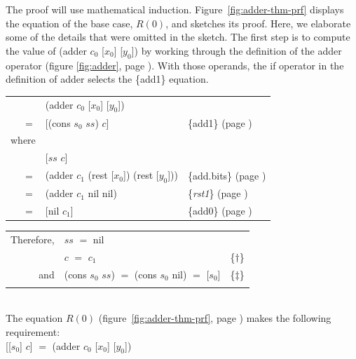 The proof will use mathematical induction.
Figure~\ref{fig:adder-thm-prf}
displays the equation of the base case, $R(0)$,
and sketches its proof. Here, we elaborate some of the details
that were omitted in the sketch.
The first step is
to compute the value of \textsf{(adder $c_0$ [$x_0$] [$y_0$])}
by working through the definition of the \textsf{adder} operator
(figure \ref{fig:adder}, page \pageref{fig:adder}).
With those operands, the \textsf{if} operator in
the definition of \textsf{adder} selects the \{add1\} equation.
\begin{center}
\begin{tabular}{rll}
       & \textsf{(adder $c_0$ [$x_0$] [$y_0$])}              & \\
\vspace{1mm}
$=$    & \textsf{[(cons $s_0$ $ss$) $c$]}                    & \{add1\} (page \pageref {fig:adder})  \\
where  &&\\
       & \textsf{[$ss$  $c$]}                                & \\
$=$    & \textsf{(adder $c_1$ (rest [$x_0$]) (rest [$y_0$]))}& \{add.bits\} (page \pageref {fig:adder}) \\
$=$    & \textsf{(adder $c_1$ nil nil)}                      & \{\emph{rst1}\} (page \pageref {rst1}) \\
$=$    & \textsf{[nil  $c_1$]}                               & \{add0\} (page \pageref {fig:adder}) \\
\end{tabular}
\end{center}
\addtolength{\tabcolsep}{-1mm}
\begin{tabular}{rll}
Therefore, & $ss$ $=$ \textsf{nil}                                       & \\
           & $c$ $=$ $c_1$                                      & \{$\dagger$\} \\
and        & \textsf{(cons $s_0$ $ss$}) $=$ \textsf{(cons $s_0$ nil)} $=$ \textsf{[$s_0$]} & \{$\ddagger$\}\\
           &                                                    & \\
\end{tabular}\\
\addtolength{\tabcolsep}{1mm}
The equation $R(0)$ (figure~\ref{fig:adder-thm-prf}, page \pageref{fig:adder-thm-prf})
makes the following requirement:
\vspace{1mm}\\
\hspace*{1.5cm}\textsf{[[$s_0$] $c$]} $=$ \textsf{(adder $c_0$ [$x_0$] [$y_0$])}
